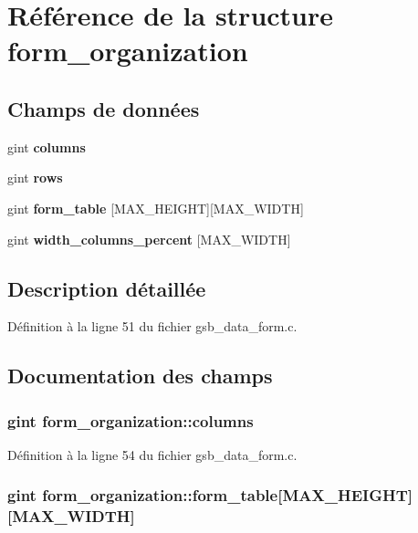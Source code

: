 \section{Référence de la structure form\_\-organization}
\label{structform__organization}
\subsection*{Champs de données}
\begin{DoxyCompactItemize}
\item 
gint {\bf columns}
\item 
gint {\bf rows}
\item 
gint {\bf form\_\-table} [MAX\_\-HEIGHT][MAX\_\-WIDTH]
\item 
gint {\bf width\_\-columns\_\-percent} [MAX\_\-WIDTH]
\end{DoxyCompactItemize}


\subsection{Description détaillée}


Définition à la ligne 51 du fichier gsb\_\-data\_\-form.c.



\subsection{Documentation des champs}
\subsubsection[{columns}]{\setlength{\rightskip}{0pt plus 5cm}gint {\bf form\_\-organization::columns}}\label{structform__organization_a216862dbacc9bb4b3570bb2b0a346324}


Définition à la ligne 54 du fichier gsb\_\-data\_\-form.c.

\subsubsection[{form\_\-table}]{\setlength{\rightskip}{0pt plus 5cm}gint {\bf form\_\-organization::form\_\-table}[MAX\_\-HEIGHT][MAX\_\-WIDTH]}\label{structform__organization_a74fdc5856bd870532d56599ebf9d1960}


